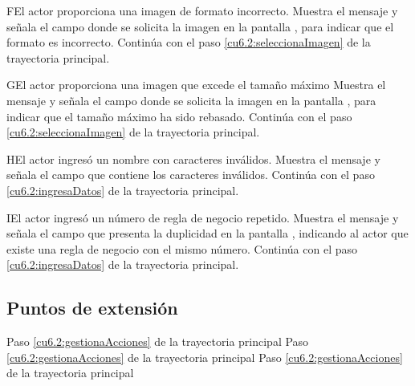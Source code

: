  \begin{UCtrayectoriaA}{F}{El actor proporciona una imagen de formato incorrecto.}
    \UCpaso[\UCsist] Muestra el mensaje  y señala el campo donde se solicita la imagen
    en la pantalla , para indicar que el formato es incorrecto.
    \UCpaso[] Continúa con el paso \ref{cu6.2:seleccionaImagen} de la trayectoria principal.
 \end{UCtrayectoriaA}
 
 \begin{UCtrayectoriaA}{G}{El actor proporciona una imagen que excede el tamaño máximo}
    \UCpaso[\UCsist] Muestra el mensaje  y señala el campo donde se solicita la imagen
    en la pantalla , para indicar que el tamaño máximo ha sido rebasado.
    \UCpaso[] Continúa con el paso \ref{cu6.2:seleccionaImagen} de la trayectoria principal.
 \end{UCtrayectoriaA}
 
 \begin{UCtrayectoriaA}{H}{El actor ingresó un nombre con caracteres inválidos.}
    \UCpaso[\UCsist] Muestra el mensaje  y señala el campo que contiene los caracteres inválidos.
    \UCpaso[] Continúa con el paso \ref{cu6.2:ingresaDatos} de la trayectoria principal.
 \end{UCtrayectoriaA}
 \begin{UCtrayectoriaA}{I}{El actor ingresó un número de regla de negocio repetido.}
    \UCpaso[\UCsist] Muestra el mensaje  y señala el campo que presenta la duplicidad en la pantalla 
	    , indicando al actor que existe una regla de negocio con el mismo número.
    \UCpaso[] Continúa con el paso \ref{cu6.2:ingresaDatos} de la trayectoria principal.
 \end{UCtrayectoriaA}

\subsection{Puntos de extensión}

	{Paso \ref{cu6.2:gestionaAcciones} de la trayectoria principal}
	{}
	{Paso \ref{cu6.2:gestionaAcciones} de la trayectoria principal}
	{}	
	{Paso \ref{cu6.2:gestionaAcciones} de la trayectoria principal}
	{}